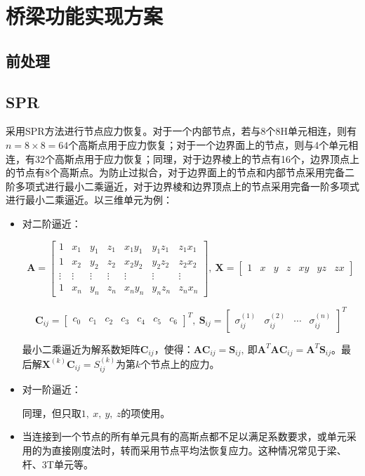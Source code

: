 \documentclass[UTF8]{ctexbook}
\begin{document}
\section{桥梁功能实现方案}
\subsection{前处理}

\subsection{SPR}
采用SPR方法进行节点应力恢复。对于一个内部节点，若与8个8H单元相连，则有$n=8\times8=64$个高斯点用于应力恢复；对于一个边界面上的节点，则与4个单元相连，有32个高斯点用于应力恢复；同理，对于边界棱上的节点有16个，边界顶点上的节点有8个高斯点。为防止过拟合，对于边界面上的节点和内部节点采用完备二阶多项式进行最小二乘逼近，对于边界棱和边界顶点上的节点采用完备一阶多项式进行最小二乘逼近。以三维单元为例：
\begin{itemize}
\item 对二阶逼近：


\[
\boldsymbol{A}=\begin{bmatrix}1 & x_{1} & y_{1} & z_{1} & x_{1}y_{1} & y_{1}z_{1} & z_{1}x_{1}\\
1 & x_{2} & y_{2} & z_{2} & x_{2}y_{2} & y_{2}z_{2} & z_{2}x_{2}\\
\vdots & \vdots & \vdots & \vdots & \vdots & \vdots & \vdots\\
1 & x_{n} & y_{n} & z_{n} & x_{n}y_{n} & y_{n}z_{n} & z_{n}x_{n}
\end{bmatrix},\ \boldsymbol{X}=\begin{bmatrix}1 & x & y & z & xy & yz & zx\end{bmatrix}
\]



\[
\boldsymbol{C}_{ij}=\begin{bmatrix}c_{0} & c_{1} & c_{2} & c_{3} & c_{4} & c_{5} & c_{6}\end{bmatrix}^{T},\ \boldsymbol{S}_{ij}=\begin{bmatrix}\sigma_{ij}^{(1)} & \sigma_{ij}^{(2)} & \cdots & \sigma_{ij}^{(n)}\end{bmatrix}^{T}
\]



最小二乘逼近为解系数矩阵$\boldsymbol{C}_{ij}$，使得：$\boldsymbol{AC}_{ij}=\boldsymbol{S}_{ij},\ \text{即}\boldsymbol{A}^{T}\boldsymbol{AC}_{ij}=\boldsymbol{A}^{T}\boldsymbol{S}_{ij}$。最后解$\boldsymbol{X}^{(k)}\boldsymbol{C}_{ij}=S_{ij}^{(k)}$为第$k$个节点上的应力。

\item 对一阶逼近：


同理，但只取$1,\ x,\ y,\ z$的项使用。

\item 当连接到一个节点的所有单元具有的高斯点都不足以满足系数要求，或单元采用的为直接刚度法时，转而采用节点平均法恢复应力。这种情况常见于梁、杆、3T单元等。
\end{itemize}
\end{document}
